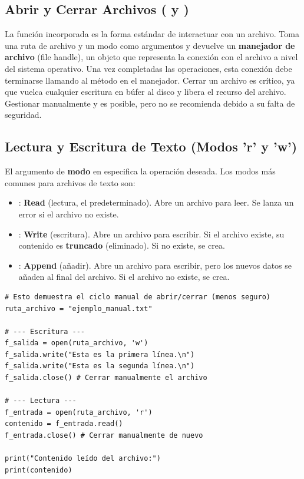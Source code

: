 \subsection{Abrir y Cerrar Archivos ( y )}
\label{subsec:open_close}
La función incorporada  es la forma estándar de interactuar con un archivo. Toma una ruta de archivo y un modo como argumentos y devuelve un \textbf{manejador de archivo} (file handle), un objeto que representa la conexión con el archivo a nivel del sistema operativo. Una vez completadas las operaciones, esta conexión debe terminarse llamando al método  en el manejador. Cerrar un archivo es crítico, ya que vuelca cualquier escritura en búfer al disco y libera el recurso del archivo. Gestionar manualmente  y  es posible, pero no se recomienda debido a su falta de seguridad.

\subsection{Lectura y Escritura de Texto (Modos 'r' y 'w')}
\label{subsec:read_write_modes}
El argumento de \textbf{modo} en  especifica la operación deseada. Los modos más comunes para archivos de texto son:
\begin{itemize}
    \item {}: \textbf{Read} (lectura, el predeterminado). Abre un archivo para leer. Se lanza un error si el archivo no existe.
    \item {}: \textbf{Write} (escritura). Abre un archivo para escribir. Si el archivo existe, su contenido es \textbf{truncado} (eliminado). Si no existe, se crea.
    \item {}: \textbf{Append} (añadir). Abre un archivo para escribir, pero los nuevos datos se añaden al final del archivo. Si el archivo no existe, se crea.
\end{itemize}

\text{ }\begin{verbatim}
# Esto demuestra el ciclo manual de abrir/cerrar (menos seguro)
ruta_archivo = "ejemplo_manual.txt"

# --- Escritura ---
f_salida = open(ruta_archivo, 'w')
f_salida.write("Esta es la primera línea.\n")
f_salida.write("Esta es la segunda línea.\n")
f_salida.close() # Cerrar manualmente el archivo

# --- Lectura ---
f_entrada = open(ruta_archivo, 'r')
contenido = f_entrada.read()
f_entrada.close() # Cerrar manualmente de nuevo

print("Contenido leído del archivo:")
print(contenido)
\end{verbatim}

